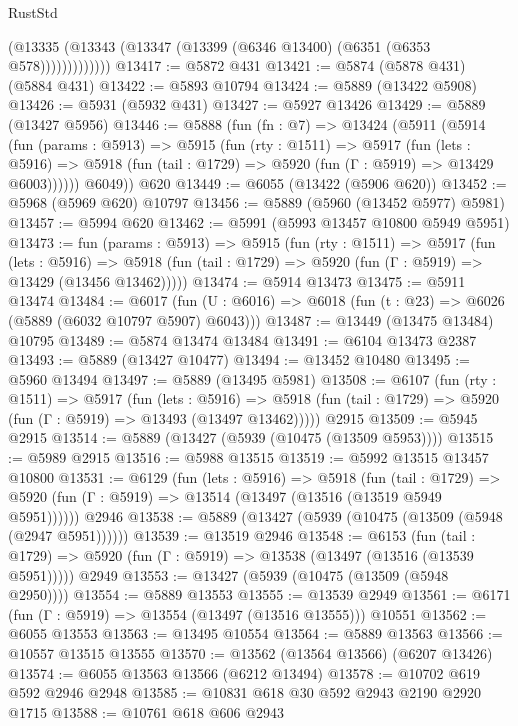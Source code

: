 \begin{lexlean}{RustStd}
\begin{coremodule}
                  (@13335 (@13343 (@13347 (@13399 (@6346 @13400) (@6351 (@6353 @578)))))))))))))
@13417 := @5872 @431
@13421 := @5874 (@5878 @431) (@5884 @431)
@13422 := @5893 @10794
@13424 := @5889 (@13422 @5908)
@13426 := @5931 (@5932 @431)
@13427 := @5927 @13426
@13429 := @5889 (@13427 @5956)
@13446 := @5888
    (fun (fn : @7) =>
    @13424
      (@5911
        (@5914
          (fun (params : @5913) =>
          @5915
            (fun (rty : @1511) =>
            @5917
              (fun (lets : @5916) =>
              @5918 (fun (tail : @1729) => @5920 (fun (Γ : @5919) => @13429 @6003))))))
        @6049))
    @620
@13449 := @6055 (@13422 (@5906 @620))
@13452 := @5968 (@5969 @620) @10797
@13456 := @5889 (@5960 (@13452 @5977) @5981)
@13457 := @5994 @620
@13462 := @5991 (@5993 @13457 @10800 @5949 @5951)
@13473 := fun (params : @5913) =>
  @5915
    (fun (rty : @1511) =>
    @5917
      (fun (lets : @5916) =>
      @5918 (fun (tail : @1729) => @5920 (fun (Γ : @5919) => @13429 (@13456 @13462)))))
@13474 := @5914 @13473
@13475 := @5911 @13474
@13484 := @6017
    (fun (U : @6016) => @6018 (fun (t : @23) => @6026 (@5889 (@6032 @10797 @5907) @6043)))
@13487 := @13449 (@13475 @13484) @10795
@13489 := @5874 @13474 @13484
@13491 := @6104 @13473 @2387
@13493 := @5889 (@13427 @10477)
@13494 := @13452 @10480
@13495 := @5960 @13494
@13497 := @5889 (@13495 @5981)
@13508 := @6107
    (fun (rty : @1511) =>
    @5917
      (fun (lets : @5916) =>
      @5918 (fun (tail : @1729) => @5920 (fun (Γ : @5919) => @13493 (@13497 @13462)))))
    @2915
@13509 := @5945 @2915
@13514 := @5889 (@13427 (@5939 (@10475 (@13509 @5953))))
@13515 := @5989 @2915
@13516 := @5988 @13515
@13519 := @5992 @13515 @13457 @10800
@13531 := @6129
    (fun (lets : @5916) =>
    @5918
      (fun (tail : @1729) =>
      @5920 (fun (Γ : @5919) => @13514 (@13497 (@13516 (@13519 @5949 @5951))))))
    @2946
@13538 := @5889 (@13427 (@5939 (@10475 (@13509 (@5948 (@2947 @5951))))))
@13539 := @13519 @2946
@13548 := @6153
    (fun (tail : @1729) => @5920 (fun (Γ : @5919) => @13538 (@13497 (@13516 (@13539 @5951)))))
    @2949
@13553 := @13427 (@5939 (@10475 (@13509 (@5948 @2950))))
@13554 := @5889 @13553
@13555 := @13539 @2949
@13561 := @6171 (fun (Γ : @5919) => @13554 (@13497 (@13516 @13555))) @10551
@13562 := @6055 @13553
@13563 := @13495 @10554
@13564 := @5889 @13563
@13566 := @10557 @13515 @13555
@13570 := @13562 (@13564 @13566) (@6207 @13426)
@13574 := @6055 @13563 @13566 (@6212 @13494)
@13578 := @10702 @619 @592 @2946 @2948
@13585 := @10831 @618 @30 @592 @2943 @2190 @2920 @1715
@13588 := @10761 @618 @606 @2943

\end{coremodule}
\end{lexlean}
